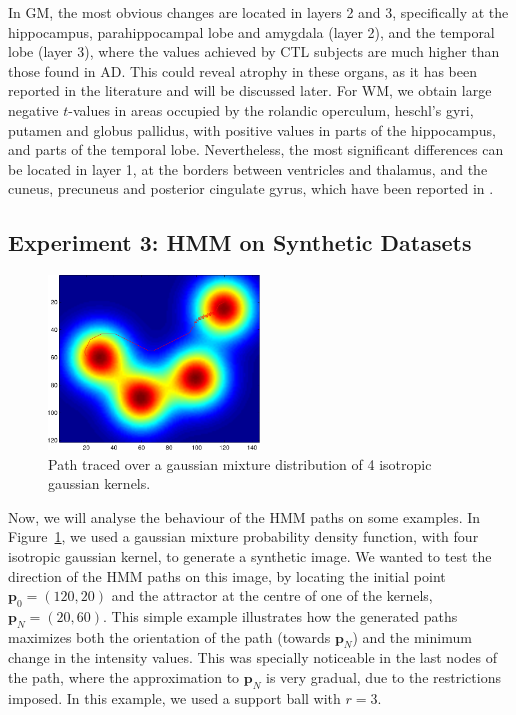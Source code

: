 In \ac{GM}, the most obvious changes are located in layers 2 and 3, specifically at the hippocampus, parahippocampal lobe and amygdala (layer 2), and the temporal lobe (layer 3), where the values achieved by \ac{CTL} subjects are much higher than those found in \ac{AD}. This could reveal atrophy in these organs, as it has been reported in the literature \cite{Dubois2007,Pievani2013} and will be discussed later. For \ac{WM}, we obtain large negative $t$-values in areas occupied by the rolandic operculum, heschl's gyri, putamen and globus pallidus, with positive values in parts of the hippocampus, and parts of the temporal lobe. Nevertheless, the most significant differences can be located in layer 1, at the borders between ventricles and thalamus, and the cuneus, precuneus and posterior cingulate gyrus, which have been reported in \cite{Baron2001}.

\subsection{Experiment 3: HMM on Synthetic Datasets}

\begin{figure}
	\begin{center}
		\includegraphics[width=0.5\textwidth]{Graphics/ch6/gaussian}
		\caption{Path traced over a gaussian mixture distribution of 4 isotropic gaussian kernels.}
		\label{fig:gaussian}
	\end{center}
\end{figure}

Now, we will analyse the behaviour of the \ac{HMM} paths on some examples. In Figure~\ref{fig:gaussian}, we used a gaussian mixture probability density function, with four isotropic gaussian kernel, to generate a synthetic image. We wanted to test the direction of the \ac{HMM} paths on this image, by locating the initial point $\mathbf{p}_0 = (120,20)$ and the attractor at the centre of one of the kernels, $\mathbf{p}_N = (20, 60)$. This simple example illustrates how the generated paths maximizes both the orientation of the path (towards $\mathbf{p}_N$) and the minimum change in the intensity values. This was specially noticeable in the last nodes of the path, where the approximation to $\mathbf{p}_N$ is very gradual, due to the restrictions imposed. In this example, we used a support ball with $r=3$.


